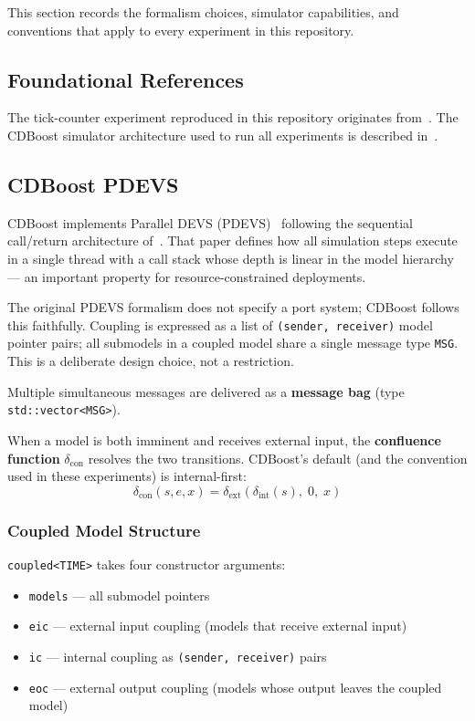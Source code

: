 This section records the formalism choices, simulator capabilities, and
conventions that apply to every experiment in this repository.

\subsection*{Foundational References}

The tick-counter experiment reproduced in this repository originates
from~\cite{VDW14}.  The CDBoost simulator architecture used to run all
experiments is described in~\cite{VNWD15}.

\subsection*{CDBoost PDEVS}

CDBoost implements Parallel DEVS (PDEVS)~\cite{ZPK00} following the
sequential call/return architecture of~\cite{VNWD15}.
That paper defines how all simulation steps execute in a single thread
with a call stack whose depth is linear in the model hierarchy --- an
important property for resource-constrained deployments.

The original PDEVS formalism does not specify a port system; CDBoost
follows this faithfully.  Coupling is expressed as a list of
\texttt{(sender, receiver)} model pointer pairs; all submodels in a
coupled model share a single message type \texttt{MSG}.  This is a
deliberate design choice, not a restriction.

Multiple simultaneous messages are delivered as a
\textbf{message bag} (type \texttt{std::vector<MSG>}).

When a model is both imminent and receives external input, the
\textbf{confluence function} $\delta_{\text{con}}$ resolves the two transitions.
CDBoost's default (and the convention used in these experiments) is
internal-first:
\[
  \delta_{\text{con}}(s, e, x) =
    \delta_{\text{ext}}\!\left(\delta_{\text{int}}(s),\; 0,\; x\right)
\]

\subsubsection*{Coupled Model Structure}

\texttt{coupled<TIME>} takes four constructor arguments:
\begin{itemize}
  \item \texttt{models} --- all submodel pointers
  \item \texttt{eic}    --- external input coupling (models that receive external input)
  \item \texttt{ic}     --- internal coupling as \texttt{(sender, receiver)} pairs
  \item \texttt{eoc}    --- external output coupling (models whose output leaves the coupled model)
\end{itemize}

